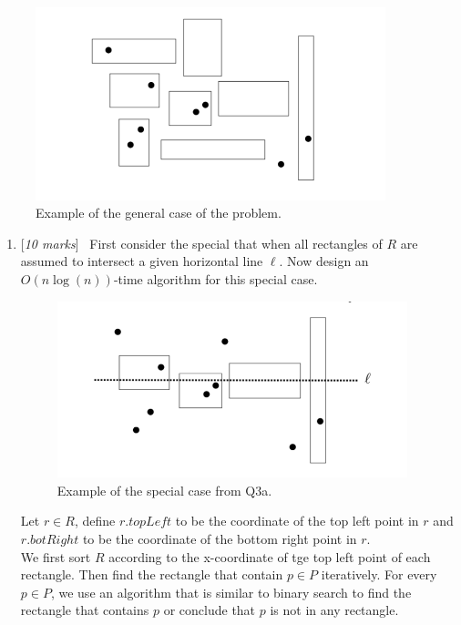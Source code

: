 \documentclass[11pt]{article}
\newcommand{\Q}[1]{\medskip\item {[{\em #1 marks\/}]}\ }
\begin{document}
\begin{enumerate}
\begin{figure}[h]
\begin{center}
\includegraphics[width=4in]{points-rectangles.png}
\end{center}
\caption{Example of the general case of the problem.}

\end{figure}

\begin{enumerate}
\Q{10} First consider the special that when all rectangles of $R$ are assumed to intersect a given horizontal line $\ell$. Now design an $O(n\log(n))$-time algorithm for this special case.

\begin{figure}[h!]
\begin{center}
\includegraphics[width=4in]{points-rectangles-x-axis.png}
\end{center}
\caption{Example of the special case from Q3a.}
\end{figure}

Let $r \in R$, define $r.topLeft$ to be the coordinate of the top left point in $r$ and $r.botRight$ to be the 
coordinate of the bottom right point in $r$.\\
We first sort $R$ according to the x-coordinate of tge top left point of each rectangle. Then find the rectangle 
that contain $p \in P$ iteratively. For every $p \in P$, we use an algorithm that is similar to binary search 
to find the rectangle that contains $p$ or conclude that $p$ is not in any rectangle.


\end{enumerate}
\end{enumerate}
\end{document}
